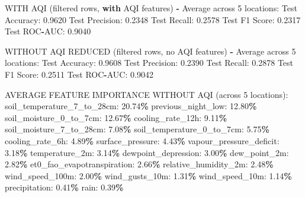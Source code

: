 \documentclass[
  letterpaper,
  DIV=11,
  numbers=noendperiod]{scrartcl}
\newenvironment{Shaded}{\begin{snugshade}}{\end{snugshade}}
\newcommand{\ControlFlowTok}[1]{\textcolor[rgb]{0.13,0.29,0.53}{\textbf{#1}}}
\newcommand{\DecValTok}[1]{\textcolor[rgb]{0.00,0.00,0.81}{#1}}
\newcommand{\FloatTok}[1]{\textcolor[rgb]{0.00,0.00,0.81}{#1}}
\newcommand{\NormalTok}[1]{#1}
\newcommand{\OperatorTok}[1]{\textcolor[rgb]{0.81,0.36,0.00}{\textbf{#1}}}
\begin{document}
\begin{Shaded}
\begin{Highlighting}[]
\NormalTok{WITH AQI (filtered rows, }\ControlFlowTok{with}\NormalTok{ AQI features) }\OperatorTok{{-}}\NormalTok{ Average across }\DecValTok{5}\NormalTok{ locations:}
\NormalTok{  Test Accuracy: }\FloatTok{0.9620}
\NormalTok{  Test Precision: }\FloatTok{0.2348}
\NormalTok{  Test Recall: }\FloatTok{0.2578}
\NormalTok{  Test F1 Score: }\FloatTok{0.2317}
\NormalTok{  Test ROC}\OperatorTok{{-}}\NormalTok{AUC: }\FloatTok{0.9040}

\NormalTok{WITHOUT AQI REDUCED (filtered rows, no AQI features) }\OperatorTok{{-}}\NormalTok{ Average across }\DecValTok{5}\NormalTok{ locations:}
\NormalTok{  Test Accuracy: }\FloatTok{0.9608}
\NormalTok{  Test Precision: }\FloatTok{0.2390}
\NormalTok{  Test Recall: }\FloatTok{0.2878}
\NormalTok{  Test F1 Score: }\FloatTok{0.2511}
\NormalTok{  Test ROC}\OperatorTok{{-}}\NormalTok{AUC: }\FloatTok{0.9042}

\NormalTok{AVERAGE FEATURE IMPORTANCE WITHOUT AQI (across }\DecValTok{5}\NormalTok{ locations):}
\NormalTok{  soil\_temperature\_7\_to\_28cm: }\FloatTok{20.74}\OperatorTok{\%}
\NormalTok{  previous\_night\_low: }\FloatTok{12.80}\OperatorTok{\%}
\NormalTok{  soil\_moisture\_0\_to\_7cm: }\FloatTok{12.67}\OperatorTok{\%}
\NormalTok{  cooling\_rate\_12h: }\FloatTok{9.11}\OperatorTok{\%}
\NormalTok{  soil\_moisture\_7\_to\_28cm: }\FloatTok{7.08}\OperatorTok{\%}
\NormalTok{  soil\_temperature\_0\_to\_7cm: }\FloatTok{5.75}\OperatorTok{\%}
\NormalTok{  cooling\_rate\_6h: }\FloatTok{4.89}\OperatorTok{\%}
\NormalTok{  surface\_pressure: }\FloatTok{4.43}\OperatorTok{\%}
\NormalTok{  vapour\_pressure\_deficit: }\FloatTok{3.18}\OperatorTok{\%}
\NormalTok{  temperature\_2m: }\FloatTok{3.14}\OperatorTok{\%}
\NormalTok{  dewpoint\_depression: }\FloatTok{3.00}\OperatorTok{\%}
\NormalTok{  dew\_point\_2m: }\FloatTok{2.82}\OperatorTok{\%}
\NormalTok{  et0\_fao\_evapotranspiration: }\FloatTok{2.66}\OperatorTok{\%}
\NormalTok{  relative\_humidity\_2m: }\FloatTok{2.48}\OperatorTok{\%}
\NormalTok{  wind\_speed\_100m: }\FloatTok{2.00}\OperatorTok{\%}
\NormalTok{  wind\_gusts\_10m: }\FloatTok{1.31}\OperatorTok{\%}
\NormalTok{  wind\_speed\_10m: }\FloatTok{1.14}\OperatorTok{\%}
\NormalTok{  precipitation: }\FloatTok{0.41}\OperatorTok{\%}
\NormalTok{  rain: }\FloatTok{0.39}\OperatorTok{\%}


\end{Highlighting}
\end{Shaded}
\end{document}
